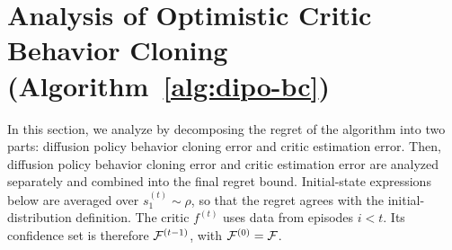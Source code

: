 \section{Analysis of Optimistic Critic Behavior Cloning (Algorithm~\ref{alg:dipo-bc})}
\label{app:dipo-bc}
In this section, we analyze  by decomposing the regret of the algorithm into two parts: diffusion policy behavior cloning error and critic estimation error. Then, diffusion policy behavior cloning error and critic estimation error are analyzed separately and combined into the final regret bound. Initial-state expressions below are averaged over $s_1^{(t)}\sim\rho$, so that the regret agrees with the initial-distribution definition. The critic $f^{(t)}$ uses data from episodes $i<t$. Its confidence set is therefore ${\mathcal{F}}^{(t-1)}$, with ${\mathcal{F}}^{(0)}={\mathcal{F}}$.

